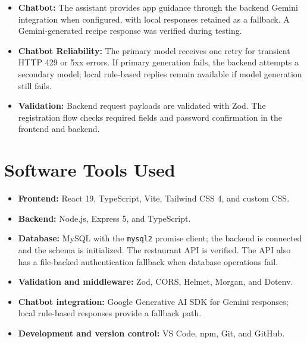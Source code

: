 \begin{itemize}
\item \textbf{Chatbot:} The assistant provides app guidance through the backend Gemini integration when configured, with local responses retained as a fallback. A Gemini-generated recipe response was verified during testing.

\item \textbf{Chatbot Reliability:} The primary model receives one retry for transient HTTP 429 or 5xx errors. If primary generation fails, the backend attempts a secondary model; local rule-based replies remain available if model generation still fails.

\item \textbf{Validation:} Backend request payloads are validated with Zod. The registration flow checks required fields and password confirmation in the frontend and backend.

\end{itemize}

\section{Software Tools Used}

\begin{itemize}

\item \textbf{Frontend:} React 19, TypeScript, Vite, Tailwind CSS 4, and custom CSS.

\item \textbf{Backend:} Node.js, Express 5, and TypeScript.

\item \textbf{Database:} MySQL with the \texttt{mysql2} promise client; the backend is connected and the schema is initialized. The restaurant API is verified. The API also has a file-backed authentication fallback when database operations fail.

\item \textbf{Validation and middleware:} Zod, CORS, Helmet, Morgan, and Dotenv.

\item \textbf{Chatbot integration:} Google Generative AI SDK for Gemini responses; local rule-based responses provide a fallback path.

\item \textbf{Development and version control:} VS Code, npm, Git, and GitHub.

\end{itemize}
